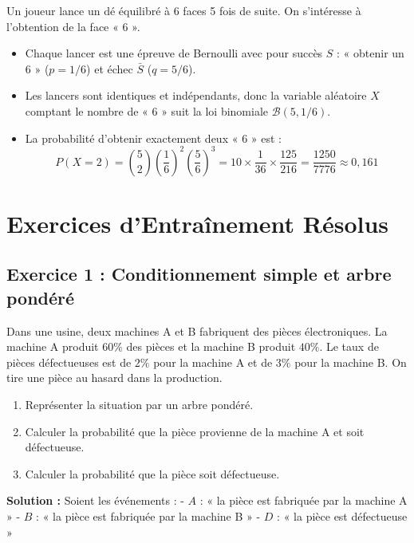 \begin{exemple}
Un joueur lance un dé équilibré à 6 faces 5 fois de suite. On s'intéresse à l'obtention de la face « 6 ».
\begin{itemize}
    \item Chaque lancer est une épreuve de Bernoulli avec pour succès $S$ : « obtenir un 6 » ($p = 1/6$) et échec $\bar{S}$ ($q = 5/6$).
    \item Les lancers sont identiques et indépendants, donc la variable aléatoire $X$ comptant le nombre de « 6 » suit la loi binomiale $\mathcal{B}(5, 1/6)$.
    \item La probabilité d'obtenir exactement deux « 6 » est :
    \[
    P(X = 2) = \binom{5}{2} \left(\frac{1}{6}\right)^2 \left(\frac{5}{6}\right)^3 = 10 \times \frac{1}{36} \times \frac{125}{216} = \frac{1250}{7776} \approx 0,161
    \]
\end{itemize}
\end{exemple}

\section{Exercices d'Entraînement Résolus}

\subsection*{Exercice 1 : Conditionnement simple et arbre pondéré}
Dans une usine, deux machines A et B fabriquent des pièces électroniques. La machine A produit $60\%$ des pièces et la machine B produit $40\%$. Le taux de pièces défectueuses est de $2\%$ pour la machine A et de $3\%$ pour la machine B. On tire une pièce au hasard dans la production.
\begin{enumerate}
    \item Représenter la situation par un arbre pondéré.
    \item Calculer la probabilité que la pièce provienne de la machine A et soit défectueuse.
    \item Calculer la probabilité que la pièce soit défectueuse.
\end{enumerate}

\textbf{Solution :}
Soient les événements :
- $A$ : « la pièce est fabriquée par la machine A »
- $B$ : « la pièce est fabriquée par la machine B »
- $D$ : « la pièce est défectueuse »

